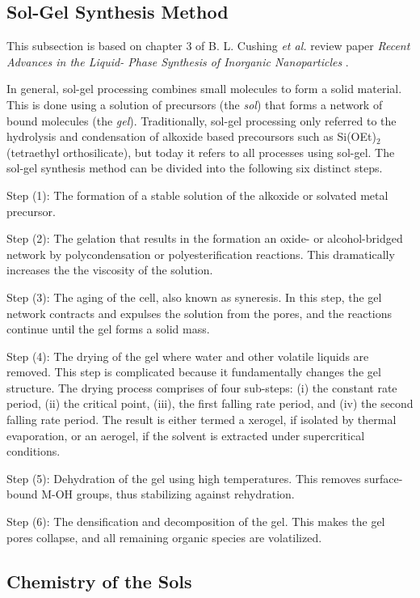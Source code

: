 \subsection{Sol-Gel Synthesis Method}
\noindent This subsection is based on chapter 3 of B. L. Cushing \textit{et al.} review paper \textit{Recent Advances in the Liquid- Phase Synthesis of Inorganic Nanoparticles} \cite{solgel_review}.

In general, sol-gel processing combines small molecules to form a solid material.
This is done using a solution of precursors (the \textit{sol}) that forms a network of bound molecules (the \textit{gel}).
Traditionally, sol-gel processing only referred to the hydrolysis and condensation of alkoxide based precoursors such as Si(OEt)$_2$ (tetraethyl orthosilicate), but today it refers to all processes using sol-gel.
The sol-gel synthesis method can be divided into the following six distinct steps.

Step (1): The formation of a stable solution of the alkoxide or solvated metal precursor.

Step (2): The gelation that results in the formation  an oxide- or alcohol-bridged network by polycondensation or polyesterification reactions.
This dramatically increases the the viscosity of the solution.

Step (3):  The aging of the cell, also known as syneresis.
In this step, the gel network contracts and expulses the solution from the pores, and the reactions continue until the gel forms a solid mass.

Step (4): The drying of the gel where water and other volatile liquids are removed.
This step is complicated because it fundamentally changes the gel structure.
The drying process comprises of four sub-steps: (i) the constant rate period, (ii) the critical point, (iii), the first falling rate period, and (iv) the second falling rate period.
The result is either termed a xerogel, if isolated by thermal evaporation, or an aerogel, if the solvent is extracted under supercritical conditions.

Step (5): Dehydration of the gel using high temperatures.
This removes surface-bound M-OH groups, thus stabilizing against rehydration.

Step (6): The densification and decomposition of the gel.
This makes the gel pores collapse, and all remaining organic species are volatilized.

\subsection{Chemistry of the Sols}

